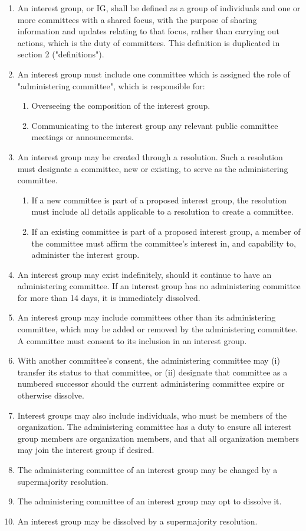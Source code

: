 \documentclass[11pt]{article}
\newcounter{h1}
\newcounter{h2}[h1]
\newcounter{h3}[h2]
\begin{document}
\begin{enumerate}
  \item An interest group, or IG, shall be defined as a group of individuals and one or more committees with a shared focus, with the purpose of sharing information and updates relating to that focus, rather than carrying out actions, which is the duty of committees. This definition is duplicated in section 2 ("definitions").  
  \item An interest group must include one committee which is assigned the role of "administering committee", which is responsible for:  
  \begin{enumerate}
    \item Overseeing the composition of the interest group.  
    \item Communicating to the interest group any relevant public committee meetings or announcements.  
  \end{enumerate}
  \item An interest group may be created through a resolution. Such a resolution must designate a committee, new or existing, to serve as the administering committee.  
  \begin{enumerate}
    \item If a new committee is part of a proposed interest group, the resolution must include all details applicable to a resolution to create a committee.  
    \item If an existing committee is part of a proposed interest group, a member of the committee must affirm the committee's interest in, and capability to, administer the interest group.  
  \end{enumerate}
  \item An interest group may exist indefinitely, should it continue to have an administering committee. If an interest group has no administering committee for more than 14 days, it is immediately dissolved.  
  \item An interest group may include committees other than its administering committee, which may be added or removed by the administering committee. A committee must consent to its inclusion in an interest group.  
  \item With another committee's consent, the administering committee may (i) transfer its status to that committee, or (ii) designate that committee as a numbered successor should the current administering committee expire or otherwise dissolve.  
  \item Interest groups may also include individuals, who must be members of the organization. The administering committee has a duty to ensure all interest group members are organization members, and that all organization members may join the interest group if desired.  
  \item The administering committee of an interest group may be changed by a supermajority resolution.  
  \item The administering committee of an interest group may opt to dissolve it.  
  \item An interest group may be dissolved by a supermajority resolution.
\end{enumerate}
\end{document}
